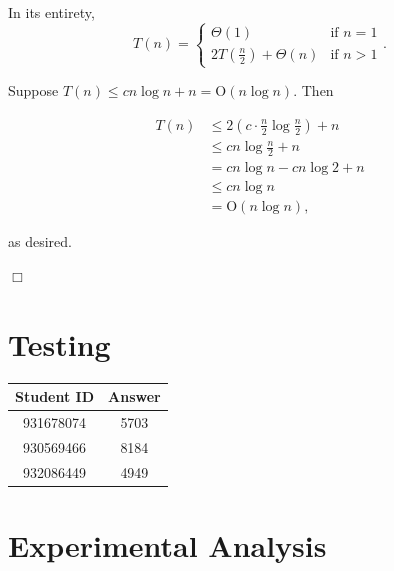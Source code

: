 \documentclass[a4paper,10pt]{article}
\begin{document}
		In its entirety, \[T(n) = \begin{cases} \Theta(1) &\mbox{if } n = 1 \\ 2T\left(\frac{n}{2}\right) + \Theta(n) &\mbox{if } n > 1 \end{cases}.\]

		Suppose $T(n) \leq cn \log n + n = \text{O}(n \log n)$. Then


		\begin{align*}
		T(n) &\leq 2\left(c \cdot \frac{n}{2} \log \frac{n}{2}\right) + n \\
		     &\leq cn \log \frac{n}{2} + n \\
		     &= cn \log n - cn \log 2 + n \\
		     &\leq cn \log n \\
		     &= \text{O}(n \log n),
		\end{align*}

		as desired.

		\begin{center}
		$\Box$
		\end{center}


	\section{Testing}

		\begin{tabular}{ | c | c | }
		\hline
		Student ID & Answer\\ \hline
		931678074 & 5703 \\
		930569466 & 8184 \\
		932086449 & 4949 \\
		\hline
		\end{tabular}

	\newpage
	\section{Experimental Analysis}
\end{document}
